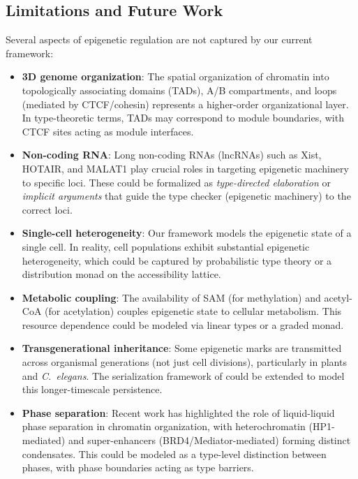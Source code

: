 \documentclass[12pt,a4paper]{article}
\begin{document}
\subsection{Limitations and Future Work}

Several aspects of epigenetic regulation are not captured by our current framework:

\begin{itemize}
    \item \textbf{3D genome organization}: The spatial organization of chromatin into topologically associating domains (TADs), A/B compartments, and loops (mediated by CTCF/cohesin) represents a higher-order organizational layer. In type-theoretic terms, TADs may correspond to module boundaries, with CTCF sites acting as module interfaces.

    \item \textbf{Non-coding RNA}: Long non-coding RNAs (lncRNAs) such as Xist, HOTAIR, and MALAT1 play crucial roles in targeting epigenetic machinery to specific loci. These could be formalized as \emph{type-directed elaboration} or \emph{implicit arguments} that guide the type checker (epigenetic machinery) to the correct loci.

    \item \textbf{Single-cell heterogeneity}: Our framework models the epigenetic state of a single cell. In reality, cell populations exhibit substantial epigenetic heterogeneity, which could be captured by probabilistic type theory or a distribution monad on the accessibility lattice.

    \item \textbf{Metabolic coupling}: The availability of SAM (for methylation) and acetyl-CoA (for acetylation) couples epigenetic state to cellular metabolism. This resource dependence could be modeled via linear types or a graded monad.

    \item \textbf{Transgenerational inheritance}: Some epigenetic marks are transmitted across organismal generations (not just cell divisions), particularly in plants and \emph{C.\ elegans}. The serialization framework of  could be extended to model this longer-timescale persistence.

    \item \textbf{Phase separation}: Recent work has highlighted the role of liquid-liquid phase separation in chromatin organization, with heterochromatin (HP1-mediated) and super-enhancers (BRD4/Mediator-mediated) forming distinct condensates. This could be modeled as a type-level distinction between phases, with phase boundaries acting as type barriers.
\end{itemize}
\end{document}
